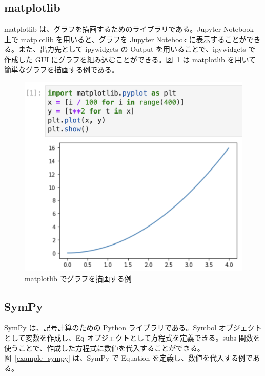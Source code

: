 \subsection{matplotlib}
matplotlib は、グラフを描画するためのライブラリである。Jupyter Notebook 上で matplotlib を用いると、グラフを Jupyter Notebook に表示することができる。また、出力先として ipywidgets の Output を用いることで、ipywidgets で作成した GUI にグラフを組み込むことができる。図~\ref{example_matplotlib} は matplotlib を用いて簡単なグラフを描画する例である。

\begin{figure}[htb]
\centering
\includegraphics[width=0.9\linewidth]{work/example_matplotlib.png}
\caption{matplotlib でグラフを描画する例} \label{example_matplotlib}
\end{figure}

\subsection{SymPy}
SymPy は、記号計算のための Python ライブラリである。Symbol オブジェクトとして変数を作成し、Eq オブジェクトとして方程式を定義できる。subs 関数を使うことで、作成した方程式に数値を代入することができる。図~\ref{example_sympy} は、SymPy で Equation を定義し、数値を代入する例である。\\\\\\

